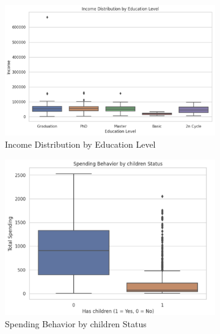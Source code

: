 \documentclass[a4paper]{article}
\begin{document}
\begin{figure}[h]
\begin{subfigure}{0.3\textwidth}
    \end{subfigure}
    \hfill
    \begin{subfigure}{0.3\textwidth}
        \includegraphics[width=\linewidth]{Income Distribution by Education Level.png}
        \caption{Income Distribution by Education Level}
        \label{fig:sub3}
    \end{subfigure}
    \hfill
    \begin{subfigure}{0.3\textwidth}
        \includegraphics[width=\linewidth]{Spending Behavior by children Status.png}
        \caption{Spending Behavior by children Status}
        \label{fig:sub4}
    \end{subfigure}
    \hfill
    \begin{subfigure}{0.3\textwidth}

\end{subfigure}
\end{figure}
\end{document}
